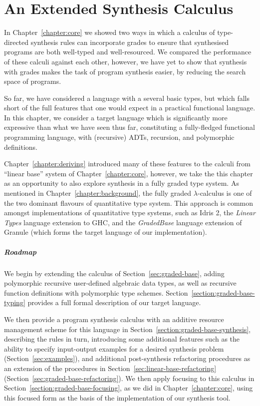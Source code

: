 \chapter{An Extended Synthesis Calculus}
\label{chapter:extended}
In Chapter~\ref{chapter:core} we showed two ways in which a calculus of
type-directed synthesis rules can incorporate grades to ensure that synthesised
programs are both well-typed and well-resourced. We compared the performance of
these calculi against each other, however, we have yet to show that synthesis
with grades makes the task of program synthesis easier, by reducing the search
space of programs. 

So far, we have considered a language with a several basic types, but which
falls short of the full features that one would expect in a practical functional
language. In this chapter, we consider a target language which is significantly
more expressive than what we have seen thus far, constituting a fully-fledged
functional programming language, with (recursive) ADTs, recursion, and 
polymorphic definitions. 

Chapter~\ref{chapter:deriving} introduced many of these features to the calculi
from ``linear base'' system of Chapter~\ref{chapter:core}, however, we take the
this chapter as an opportunity to also explore synthesis in a fully graded type
system. As mentioned in Chapter~\ref{chapter:background}, the fully graded
$\lambda$-calculus is one of the two dominant flavours of quantitative type
system. This approach is common amongst implementations of quantitative type
systems, such as Idris 2, the \emph{Linear Types} language extension to GHC, and
the \emph{GradedBase} language extension of Granule (which forms the target
language of our implementation). 

\paragraph{Roadmap}
We begin by extending the calculus of Section~\ref{sec:graded-base}, adding
polymorphic recursive user-defined algebraic data types, as well as recursive
function definitions with polymorphic type schemes.
Section~\ref{section:graded-base-typing} provides a full formal description of
our target language.

We then provide a program synthesis calculus with an additive resource
management scheme for this language in
Section~\ref{section:graded-base-synthesis}, describing the rules in turn,
introducing some additional features such as the ability to specify input-output
examples for a desired synthesis problem (Section~\ref{sec:examples}), and
additional post-synthesis refactoring procedures as an extension of the
procedures in Section~\ref{sec:linear-base-refactoring}
(Section~\ref{sec:graded-base-refactoring}). We then apply focusing to this
calculus in Section~\ref{section:graded-base-focusing}, as we did in
Chapter~\ref{chapter:core}, using this focused form as the basis of the
implementation of our synthesis tool.

